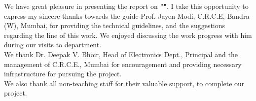 \begin{acknowledgments}

\thispagestyle{empty}

\noindent We have great pleasure in presenting the report on {\bf "\projecttitle"}. I take this opportunity to express my sincere thanks towards the guide Prof. Jayen Modi, C.R.C.E, Bandra (W), Mumbai, for providing the technical guidelines, and the suggestions regarding the line of this work. We enjoyed discussing the work progress with him during our visits to department.\\

\noindent We thank Dr. Deepak V. Bhoir, Head of Electronics Dept., Principal and the management of C.R.C.E., Mumbai for encouragement and providing necessary infrastructure for pursuing the project.\\

\noindent We also thank all non-teaching staff for their valuable support, to complete our project.
\par
%


\end{acknowledgments}


